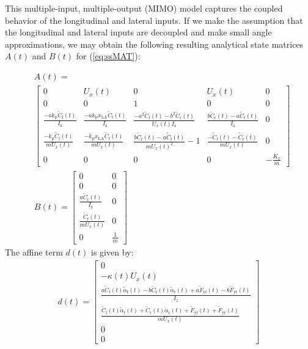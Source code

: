 \documentclass[9pt,shortpaper,twoside,web]{ieeecolor}
\begin{document}
 This multiple-input, multiple-output (MIMO) model captures the coupled behavior of the longitudinal and lateral inputs. If we make the assumption that the longitudinal and lateral inputs are decoupled and make small angle approximations, we may obtain the following resulting analytical state matrices $A(t)$ and $B(t)$ for (\ref{eq:ssMAT}):

\begin{align}
\label{eqn:C4dyn}
 &A(t)  = \\ \nonumber
  &\left[\begin{smallmatrix}
  0 & U_x(t) & 0 & U_x(t) & 0\\ 
  0 & 0 & 1 & 0 & 0 \\ 
  \frac{-ak_\mathrm{p} \tilde{C}_\mathrm{f}(t)}{I_\mathrm{z}}  & \frac{-ak_\mathrm{p}x_\mathrm{LA}\tilde{C}_\mathrm{f}(t)}{I_\mathrm{z}}  & \frac{-a^2\tilde{C}_\mathrm{f}(t)-b^2\tilde{C}_\mathrm{r}(t)}{U_x(t)I_\mathrm{z}} & \frac{b\tilde{C}_\mathrm{r}(t) - a\tilde{C}_\mathrm{f}(t)}{I_\mathrm{z}} & 0 \\
  \frac{-k_\mathrm{p}\tilde{C}_\mathrm{f}(t)}{mU_x(t)}  & \frac{-k_\mathrm{p}x_\mathrm{LA}\tilde{C}_\mathrm{f}(t)}{mU_x(t)}  & \frac{b\tilde{C}_\mathrm{r}(t)-a\tilde{C}_\mathrm{f}(t)}{mU_x(t)^2}-1 & \frac{-\tilde{C}_\mathrm{f}(t) - \tilde{C}_\mathrm{r}(t)}{mU_x(t)} & 0 \\
  0 & 0 & 0 & 0 & -\frac{K_x}{m}
  \end{smallmatrix}\right] \\
&B(t) =\begin{bmatrix} 0 & 0 \\	 	0 & 0 		\\ 		\frac{a \tilde{C}_\mathrm{f}(t)}{I_\mathrm{z}} & 0 		\\ 		\frac{\tilde{C}_\mathrm{f}(t)}{mU_x(t)} & 0 		\\ 0 & \frac{1}{m} \end{bmatrix} 
\end{align}
The affine term $d(t)$ is given by: 
\begin{align}
d(t) = \left[\begin{matrix} 0 \\
               -\kappa(t) U_x(t) \\ 
			    \frac{a\tilde{C}_\mathrm{f}(t)\tilde{\alpha}_\mathrm{f}(t) - b\tilde{C}_\mathrm{r}(t)\tilde{\alpha}_\mathrm{r}(t) + a\tilde{F}_\mathrm{yf}(t) - b\tilde{F}_\mathrm{yr}(t)}{I_z}\\
				\frac{\tilde{C}_\mathrm{f}(t)\tilde{\alpha}_\mathrm{f}(t) + \tilde{C}_\mathrm{r}(t)\tilde{\alpha}_\mathrm{r}(t) + \tilde{F}_\mathrm{yf}(t) + \tilde{F}_\mathrm{yr}(t)}{mU_x(t)}\\
				0 \\
				0
				\end{matrix}\right]
\end{align}
\end{document}
